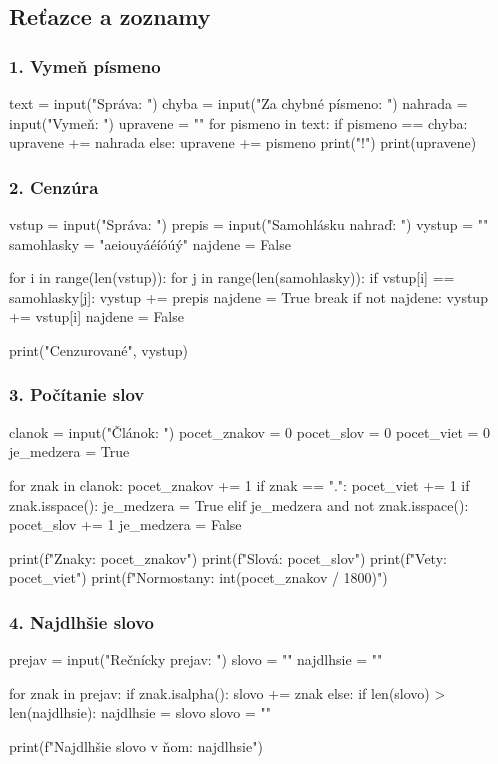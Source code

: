 \subsection{Reťazce a zoznamy}

\subsubsection*{1. Vymeň písmeno}
\begin{solution}
text = input("Správa: ")
chyba = input("Za chybné písmeno: ")
nahrada = input("Vymeň: ")
upravene = ""
for pismeno in text:
    if pismeno == chyba:
        upravene += nahrada
    else:
        upravene += pismeno
print("!")
print(upravene)
\end{solution}


\subsubsection*{2. Cenzúra}
\begin{solution}
vstup = input("Správa: ")
prepis = input("Samohlásku nahraď: ")
vystup = ""
samohlasky = "aeiouyáéíóúý"
najdene = False

for i in range(len(vstup)):
    for j in range(len(samohlasky)):
        if vstup[i] == samohlasky[j]:
            vystup += prepis
            najdene = True
            break
    if not najdene:
        vystup += vstup[i]
    najdene = False
 
print("Cenzurované", vystup)
\end{solution}

\subsubsection*{3. Počítanie slov}
\begin{solution}
clanok = input("Článok: ")
pocet_znakov = 0
pocet_slov = 0
pocet_viet = 0
je_medzera = True

for znak in clanok:
    pocet_znakov += 1
    if znak == ".":
        pocet_viet += 1
    if znak.isspace():
        je_medzera = True
    elif je_medzera and not znak.isspace():
        pocet_slov += 1
        je_medzera = False

print(f"Znaky: {pocet_znakov}")
print(f"Slová: {pocet_slov}")
print(f"Vety: {pocet_viet}")
print(f"Normostany: {int(pocet_znakov / 1800)}")
\end{solution}


\subsubsection*{4. Najdlhšie slovo}
\begin{solution}
prejav = input("Rečnícky prejav: ")
slovo = ""
najdlhsie = ""

for znak in prejav:
    if znak.isalpha():
        slovo += znak
    else:
        if len(slovo) > len(najdlhsie):
            najdlhsie = slovo
        slovo = ""

print(f"Najdlhšie slovo v ňom: {najdlhsie}")
\end{solution}

